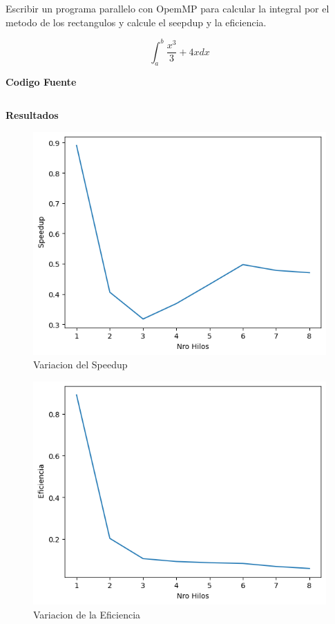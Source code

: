 \maketitle

Escribir un programa parallelo con OpemMP para calcular la integral por el
metodo de los rectangulos y calcule el seepdup y la eficiencia.

\[
    \int_a^b \frac{x^3}{3} + 4x dx
\]

\medskip
\large{\textbf{Codigo Fuente}}
\inputminted[breaklines]{c}{./code/integral_triangle_method.c}

\medskip
\large{\textbf{Resultados}}


\begin{figure}[h]
\caption{Variacion del Speedup}
\centering
\includegraphics[scale=0.65]{./images/comparacion_speedup.png}
\end{figure}

\begin{figure}[h]
\caption{Variacion de la Eficiencia}
\centering
\includegraphics[scale=0.65]{./images/comparacion_efficiency.png}
\end{figure}

